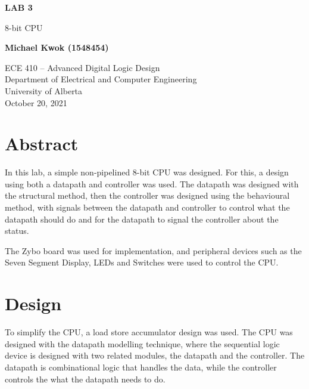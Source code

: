 \documentclass[12pt]{article}
\begin{document}
\begin{titlepage}
  \begin{center}
    \vspace*{1cm}

    \textbf{LAB 3}

    \vspace{0.5cm}

    8-bit CPU

    \vspace{1.5cm}

    \textbf{Michael Kwok (1548454)}

    \vfill

    ECE 410 -- Advanced Digital Logic Design\\
    Department of Electrical and Computer Engineering\\
    University of Alberta\\
    October 20, 2021

  \end{center}
\end{titlepage}

\tableofcontents

\pagebreak

\section{Abstract}

In this lab, a simple non-pipelined 8-bit CPU was designed. For this, a design using both a datapath and controller was used. The datapath was designed with the structural method, then the controller was designed using the behavioural method, with signals between the datapath and controller to control what the datapath should do and for the datapath to signal the controller about the status. 

The Zybo board was used for implementation, and peripheral devices such as the Seven Segment Display, LEDs and Switches were used to control the CPU.

\section{Design}

To simplify the CPU, a load store accumulator design was used. The CPU was designed with the datapath modelling technique, where the sequential logic device is designed with two related modules, the datapath and the controller. The datapath is combinational logic that handles the data, while the controller controls the what the datapath needs to do.
\end{document}
